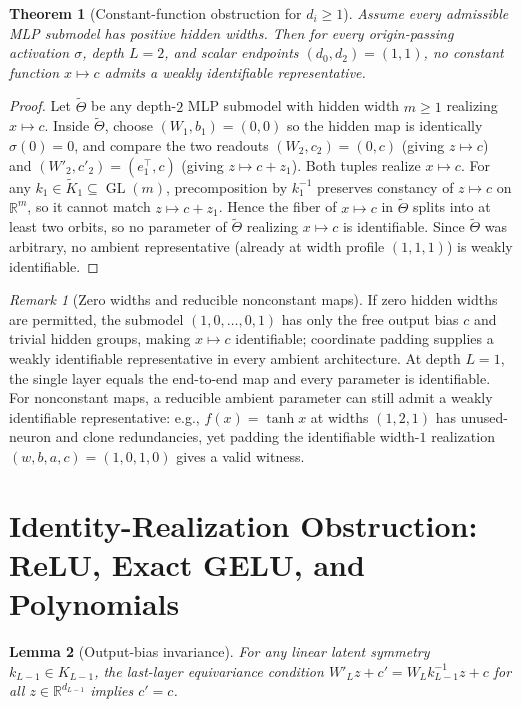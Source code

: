 \documentclass[11pt]{article}
\theoremstyle{plain}
\newtheorem{theorem}{Theorem}
\newtheorem{lemma}[theorem]{Lemma}
\theoremstyle{definition}
\theoremstyle{remark}
\newtheorem{remark}{Remark}
\DeclareMathOperator{\GL}{GL}
\begin{document}
\begin{theorem}[Constant-function obstruction for $d_i \ge 1$]\label{thm:const}
Assume every admissible MLP submodel has positive hidden widths. Then for every origin-passing activation $\sigma$, depth $L = 2$, and scalar endpoints $(d_0, d_2) = (1, 1)$, no constant function $x \mapsto c$ admits a weakly identifiable representative.
\end{theorem}

\begin{proof}
Let $\tilde{\Theta}$ be any depth-$2$ MLP submodel with hidden width $m \ge 1$ realizing $x \mapsto c$. Inside $\tilde{\Theta}$, choose $(W_1, b_1) = (0, 0)$ so the hidden map is identically $\sigma(0) = 0$, and compare the two readouts $(W_2, c_2) = (0, c)$ (giving $z \mapsto c$) and $(W'_2, c'_2) = (e_1^\top, c)$ (giving $z \mapsto c + z_1$).
Both tuples realize $x \mapsto c$. For any $k_1 \in \tilde{K}_1 \subseteq \GL(m)$, precomposition by $k_1^{-1}$ preserves constancy of $z \mapsto c$ on $\mathbb{R}^m$, so it cannot match $z \mapsto c + z_1$.
Hence the fiber of $x \mapsto c$ in $\tilde{\Theta}$ splits into at least two orbits, so no parameter of $\tilde{\Theta}$ realizing $x \mapsto c$ is identifiable. Since $\tilde{\Theta}$ was arbitrary, no ambient representative (already at width profile $(1, 1, 1)$) is weakly identifiable.
\end{proof}

\begin{remark}[Zero widths and reducible nonconstant maps]
If zero hidden widths are permitted, the submodel $(1, 0, \dots, 0, 1)$ has only the free output bias $c$ and trivial hidden groups, making $x \mapsto c$ identifiable; coordinate padding supplies a weakly identifiable representative in every ambient architecture. At depth $L = 1$, the single layer equals the end-to-end map and every parameter is identifiable. For nonconstant maps, a reducible ambient parameter can still admit a weakly identifiable representative: e.g., $f(x) = \tanh x$ at widths $(1, 2, 1)$ has unused-neuron and clone redundancies, yet padding the identifiable width-$1$ realization $(w, b, a, c) = (1, 0, 1, 0)$ gives a valid witness.
\end{remark}

\section{Identity-Realization Obstruction: ReLU, Exact GELU, and Polynomials}

\begin{lemma}[Output-bias invariance]\label{lem:bias}
For any linear latent symmetry $k_{L-1} \in K_{L-1}$, the last-layer equivariance condition $W'_L z + c' = W_L k_{L-1}^{-1} z + c$ for all $z \in \mathbb{R}^{d_{L-1}}$ implies $c' = c$.
\end{lemma}
\end{document}
